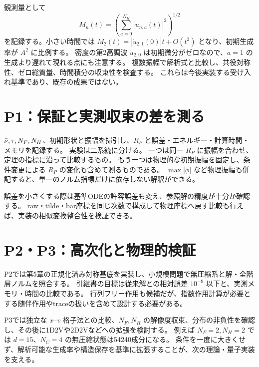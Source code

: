 観測量として
\[
M_n(t)=\left(\sum_{a=0}^{N_H}|u_{n,a}(t)|^2\right)^{1/2}
\]
を記録する。小さい時間では $M_2(t)=|\dot u_{2,1}(0)|t+O(t^2)$ となり、初期生成率が $A^2$ に比例する。
密度の第2高調波 $u_{2,0}$ は初期微分がゼロなので、$a=1$ の生成より遅れて現れる点にも注意する。
複数振幅で解析式と比較し、共役対称性、ゼロ総質量、時間積分の収束性を検査する。
これらは今後実装する受け入れ基準であり、既存の成果ではない。

\section{P1：保証と実測収束の差を測る}
$\bar\nu,\tau,N_F,N_H$、初期形状と振幅を掃引し、$R_P$ と誤差・エネルギー・計算時間・メモリを記録する。
実験は二系統に分ける。
一つは同一 $R_P$ に振幅を合わせ、定理の指標に沿って比較するもの。
もう一つは物理的な初期振幅を固定し、条件変更による $R_P$ の変化も含めて測るものである。
$\max|\phi|$ など物理振幅も併記すると、単一のノルム指標だけに依存しない解釈ができる。

誤差を小さくする際は基準ODEの許容誤差も変え、参照解の精度が十分か確認する。
raw・tilde・bar座標を同じ次数で構成して物理座標へ戻す比較も行えば、実装の相似変換整合性を検証できる。

\section{P2・P3：高次化と物理的検証}
P2では第5章の正規化済み対称基底を実装し、小規模問題で無圧縮系と解・全階層ノルムを照合する。
引継書の目標は従来解との相対誤差 $10^{-9}$ 以下と、実測メモリ・時間の比較である。
行列フリー作用も候補だが、指数作用計算が必要とする随伴作用やtraceの扱いを含めて設計する必要がある。

P3では独立な $x$--$v$ 格子法との比較、$N_F,N_H$ の解像度収束、分布の非負性を確認し、その後に1D2Vや2D2Vなどへの拡張を検討する。
例えば $N_F=2,N_H=2$ では $d=15$、$N_C=4$ の無圧縮状態は54240成分になる。
条件を一度に大きくせず、解析可能な生成率や構造保存を基準に拡張することが、次の理論・量子実装を支える。

